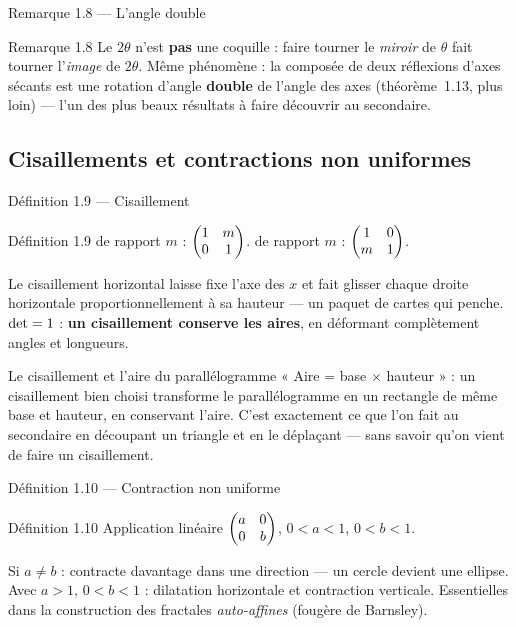 \begin{frame}{Remarque 1.8 --- L'angle double}
  \begin{Rem}{Remarque 1.8}
    Le $2\theta$ n'est \textbf{pas} une coquille : faire tourner le
    \emph{miroir} de $\theta$ fait tourner l'\emph{image} de
    $2\theta$. Même phénomène : la composée de deux réflexions d'axes
    sécants est une rotation d'angle \textbf{double} de l'angle des
    axes (théorème~1.13, plus loin) --- l'un des plus beaux résultats
    à faire découvrir au secondaire.
  \end{Rem}
\end{frame}

\subsection{Cisaillements et contractions non uniformes}
\begin{frame}{Définition 1.9 --- Cisaillement}
  \begin{Enonce}{Définition 1.9}
     de rapport $m$ : $\begin{pmatrix}1 & m\\ 0 & 1\end{pmatrix}$.
     de rapport $m$ : $\begin{pmatrix}1 & 0\\ m & 1\end{pmatrix}$.
  \end{Enonce}
  \small Le cisaillement horizontal laisse fixe l'axe des $x$ et fait
  glisser chaque droite horizontale proportionnellement à sa hauteur ---
  un paquet de cartes qui penche. $\operatorname{det} = 1$ : \textbf{un cisaillement
  conserve les aires}, en déformant complètement angles et longueurs.
  \begin{Classe}{Le cisaillement et l'aire du parallélogramme}
    \small « Aire = base $\times$ hauteur » : un cisaillement bien
    choisi transforme le parallélogramme en un rectangle de même base
    et hauteur, en conservant l'aire. C'est exactement ce que l'on fait
    au secondaire en découpant un triangle et en le déplaçant --- sans
    savoir qu'on vient de faire un cisaillement.
  \end{Classe}
\end{frame}

\begin{frame}{Définition 1.10 --- Contraction non uniforme}
  \begin{Enonce}{Définition 1.10}
    Application linéaire $\begin{pmatrix}a & 0\\ 0 & b\end{pmatrix}$, $0<a<1$, $0<b<1$.
  \end{Enonce}
  \small Si $a\neq b$ : contracte davantage dans une direction ---
  un cercle devient une ellipse. Avec $a>1$, $0<b<1$ : dilatation
  horizontale et contraction verticale. Essentielles dans la
  construction des fractales \emph{auto-affines} (fougère de Barnsley).
\end{frame}

